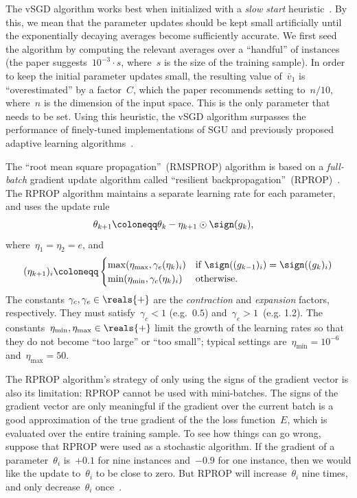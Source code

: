 \documentclass[11pt,a4paper]{article}
\numberwithin{equation}{section}
\begin{document}
The vSGD algorithm works best when initialized with a \emph{slow start}
heuristic~\citep{schaul-icml-13}. By this, we mean that the parameter updates
should be kept small artificially until the exponentially decaying averages
become sufficiently accurate. We first seed the algorithm by computing the
relevant averages over a ``handful'' of instances (the paper suggests~$10^{-3}
\cdot s$, where~$s$ is the size of the training sample). In order to keep the
initial parameter updates small, the resulting value of~$\bar{v}_1$ is
``overestimated'' by a factor~$C$, which the paper recommends setting to~$n /
10$, where~$n$ is the dimension of the input space. This is the only parameter
that needs to be set. Using this heuristic, the vSGD algorithm surpasses the
performance of finely-tuned implementations of SGU and previously proposed
adaptive learning algorithms~\citep{schaul-icml-13}.

The ``root mean square propagation''~(RMSPROP) algorithm is based on a
\emph{full-batch} gradient update algorithm called ``resilient
backpropagation''~(RPROP)~\citep{hinton-nnml-2014}. The RPROP algorithm
maintains a separate learning rate for each parameter, and uses the update rule
\begin{align*}
	\theta_{k + 1} &\coloneqq \theta_k - \eta_{k + 1} \odot \sign(g_k),
\end{align*}
where~$\eta_1 = \eta_2 = e$, and
\[
	(\eta_{k + 1})_i \coloneqq
	\begin{cases} 
	\max(\eta_{\text{max}}, \gamma_e (\eta_k)_i) &
		\text{if $\sign((g_{k - 1})_i) = \sign((g_k)_i)$} \\
	\min(\eta_{\text{min}}, \gamma_c (\eta_k)_i) &
		\text{otherwise.}
	\end{cases}
\]
The constants $\gamma_c, \gamma_e \in \reals{+}$ are the \emph{contraction} and
\emph{expansion} factors, respectively. They must satisfy~$\gamma_c < 1$
(e.g.~$0.5$) and~$\gamma_e > 1$~(e.g. 1.2). The constants~$\eta_{\text{min}},
\eta_{\text{max}} \in \reals{+}$ limit the growth of the learning rates so that
they do not become ``too large'' or ``too small''; typical settings
are~$\eta_{\text{min}} = 10^{-6}$ and~$\eta_{\text{max}} = 50$.

The RPROP algorithm's strategy of only using the signs of the gradient vector is
also its limitation: RPROP cannot be used with mini-batches. The signs of the
gradient vector are only meaningful if the gradient over the current batch is a
good approximation of the true gradient of the the loss function~$E$, which is
evaluated over the entire training sample. To see how things can go wrong,
suppose that RPROP were used as a stochastic algorithm. If the gradient of a
parameter~$\theta_i$ is~$+0.1$ for nine instances and~$-0.9$ for one instance,
then we would like the update to~$\theta_i$ to be close to zero. But RPROP will
increase~$\theta_i$ nine times, and only decrease~$\theta_i$
once~\citep{hinton-nnml-2014}.
\end{document}
